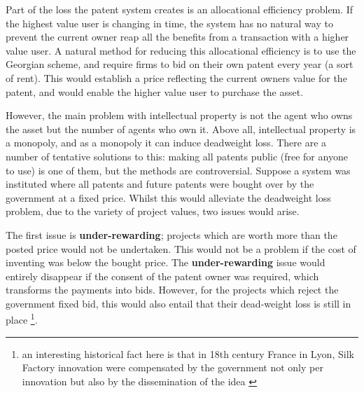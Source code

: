 
Part of the loss the patent system creates is an allocational efficiency problem. If the highest value user is changing in time, the system has no natural way to prevent the current owner reap all the benefits from a transaction with a higher value user. A natural method for reducing this allocational efficiency is to use the Georgian scheme, and require firms to bid on their own patent every year (a sort of rent). This would establish a price reflecting the current owners value for the patent, and would enable the higher value user to purchase the asset. 

However, the main problem with intellectual property is not the agent who owns the asset but the number of agents who own it. Above all, intellectual property is a monopoly, and as a monopoly it can induce deadweight loss. There are a number of tentative solutions to this: making all patents public (free for anyone to use) is one of them, but the methods are controversial. Suppose a system was instituted where all patents and future patents were bought over by the government at a fixed price. Whilst this would alleviate the deadweight loss problem, due to the variety of project values, two issues would arise. 

The first issue is \textbf{under-rewarding}; projects which are worth more than the posted price would not be undertaken. This would not be a problem if the cost of inventing was below the bought price. The \textbf{under-rewarding} issue would entirely disappear if the consent of the patent owner was required, which transforms the payments into bids. However, for the projects which reject the government fixed bid, this would also entail that their dead-weight loss is still in place \footnote{an interesting historical fact here is that in 18th century France in Lyon, Silk Factory innovation were compensated by the government not only per innovation but also by the dissemination of the idea \cite{foray2013patent}}.


